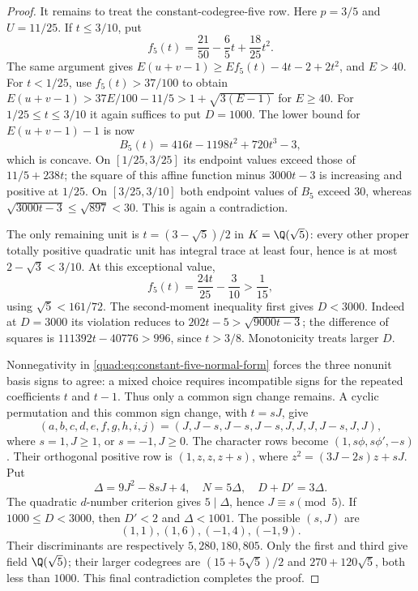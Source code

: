 \begin{proof}
It remains to treat the constant-codegree-five row. Here
$p=3/5$ and $U=11/25$. If $t\le3/10$, put
\[
 f_5(t)=\frac{21}{50}-\frac65t+\frac{18}{25}t^2.
\]
The same argument gives
$E(u+v-1)\ge Ef_5(t)-4t-2+2t^2$, and $E>40$.
For $t<1/25$, use $f_5(t)>37/100$ to obtain
$E(u+v-1)>37E/100-11/5>1+\sqrt{3(E-1)}$ for $E\ge40$.
For $1/25\le t\le3/10$ it again suffices to put $D=1000$.
The lower bound for $E(u+v-1)-1$ is now
\[
 B_5(t)=416t-1198t^2+720t^3-3,
\]
which is concave. On $[1/25,3/25]$ its endpoint values exceed those
of $11/5+238t$; the square of this affine function minus $3000t-3$
is increasing and positive at $1/25$. On $[3/25,3/10]$ both endpoint
values of $B_5$ exceed $30$, whereas
$\sqrt{3000t-3}\le\sqrt{897}<30$. This is again a contradiction.

The only remaining unit is $t=(3-\sqrt5)/2$ in
$K=\Q(\sqrt5)$: every other proper totally positive quadratic
unit has integral trace at least four, hence is at most
$2-\sqrt3<3/10$. At this exceptional value,
\[
 f_5(t)=\frac{24t}{25}-\frac3{10}>\frac1{15},
\]
using $\sqrt5<161/72$. The second-moment inequality first gives
$D<3000$. Indeed at $D=3000$ its violation reduces to
$202t-5>\sqrt{9000t-3}$; the difference of squares is
$111392t-40776>996$, since $t>3/8$. Monotonicity treats larger $D$.

Nonnegativity in \eqref{quad:eq:constant-five-normal-form} forces
the three nonunit basis signs to agree: a mixed choice requires
incompatible signs for the repeated coefficients $t$ and $t-1$.
Thus only a common sign change remains. A cyclic permutation and
this common sign change, with $t=sJ$, give
\[
 (a,b,c,d,e,f,g,h,i,j)
 =(J,J-s,J-s,J-s,J,J,J,J-s,J,J),
\]
where $s=1,J\ge1$, or $s=-1,J\ge0$. The character rows become $(1,s\phi,s\phi',-s)$.
Their orthogonal positive row is $(1,z,z,z+s)$, where
$z^2=(3J-2s)z+sJ$. Put
\[
 \Delta=9J^2-8sJ+4,\quad N=5\Delta,
 \quad D+D'=3\Delta.
\]
The quadratic $d$-number criterion gives $5\mid\Delta$, hence
$J\equiv s\pmod5$. If $1000\le D<3000$, then $D'<2$ and
$\Delta<1001$. The possible $(s,J)$ are
\[
 (1,1),(1,6),(-1,4),(-1,9).
\]
Their discriminants are respectively $5,280,180,805$.
Only the first and third give field $\Q(\sqrt5)$; their
larger codegrees are $(15+5\sqrt5)/2$ and $270+120\sqrt5$, both
less than $1000$. This final contradiction completes the proof.
\end{proof}

